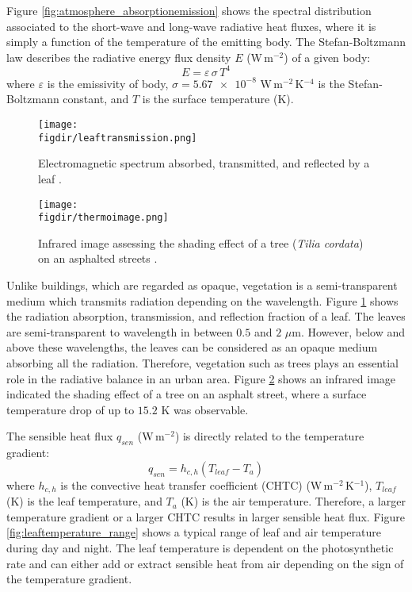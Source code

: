 Figure \ref{fig:atmosphere_absorptionemission} shows the spectral distribution associated to the short-wave and long-wave radiative heat fluxes, where it is simply a function of the temperature of the emitting body. The Stefan-Boltzmann law describes the radiative energy flux density $E$  (W\,m$^{-2}$) of a given body:
\begin{equation}
E = \varepsilon\,\sigma\,T^4
\end{equation}  
where $\varepsilon$ is the emissivity of body, $\sigma = \num{5.67e-8}$ W\,m$^{-2}$\,K$^{-4}$ is the Stefan-Boltzmann constant, and $T$ is the surface temperature (K). 

\begin{figure}[p]
	\centering
	\texttt{[image: \\figdir/leaftransmission.png]}
	\caption{Electromagnetic spectrum absorbed, transmitted, and reflected by a leaf \citep{Lambers2008,nobel2009physicochemical}. }
	\label{fig:leaftransmission}
\end{figure}

\begin{figure}[p]
	\centering
	\texttt{[image: \\figdir/thermoimage.png]}
	\caption{Infrared image assessing the shading effect of a tree (\textit{Tilia cordata}) on an asphalted streets \citep{Gillner2015}. }
	\label{fig:thermoimage}
\end{figure}	

Unlike buildings, which are regarded as opaque, vegetation is a semi-trans\-parent medium which transmits radiation depending on the wavelength. Figure \ref{fig:leaftransmission} shows the radiation absorption, transmission, and reflection fraction of a leaf. The leaves are semi-transparent to wavelength in between $0.5$ and $2$ $\mu$m. However, below and above these wavelengths, the leaves can be considered as an opaque medium absorbing all the radiation. Therefore, vegetation such as trees plays an essential role in the radiative balance in an urban area. Figure \ref{fig:thermoimage} shows an infrared image indicated the shading effect of a tree on an asphalt street, where a surface temperature drop of up to $15.2$ K was observable.

The sensible heat flux $q_{\textit{sen}}$ (W\,m$^{-2}$) is directly related to the temperature gradient:
\begin{equation}
q_{\textit{sen}} = h_{c,h} \left(T_{\textit{leaf}} - T_a\right)
\end{equation}
where $h_{c,h}$ is the convective heat transfer coefficient (CHTC) (W\,m$^{-2}$\,K$^{-1}$), $T_{\textit{leaf}}$ (K) is the leaf temperature, and $T_a$ (K) is the air temperature. Therefore, a larger temperature gradient or a larger CHTC results in larger sensible heat flux. Figure \ref{fig:leaftemperature_range} shows a typical range of leaf and air temperature during day and night. The leaf temperature is dependent on the photosynthetic rate and can either add or extract sensible heat from air depending on the sign of the temperature gradient.

